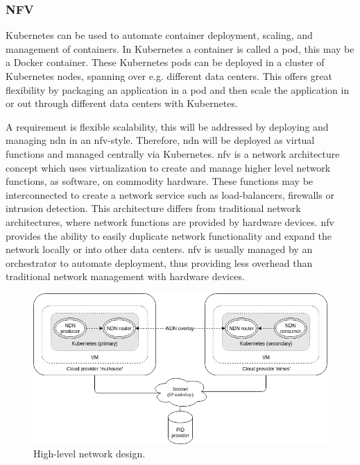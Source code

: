 \documentclass[conference]{IEEEtran}
\begin{document}
\subsubsection{NFV}
Kubernetes can be used to automate container deployment, scaling, and management of containers. In Kubernetes a container is called a pod, this may be a Docker container. These Kubernetes pods can be deployed in a cluster of Kubernetes nodes, spanning over e.g. different data centers. This offers great flexibility by packaging an application in a pod and then scale the application in or out through different data centers with Kubernetes.

A requirement is flexible scalability, this will be addressed by deploying and managing \gls{ndn} in an \gls{nfv}-style. Therefore, \gls{ndn} will be deployed as virtual functions and managed centrally via Kubernetes. \gls{nfv} is a network architecture concept which uses virtualization to create and manage higher level network functions, as software, on commodity hardware. These functions may be interconnected to create a network service such as load-balancers, firewalls or intrusion detection. This architecture differs from traditional network architectures, where network functions are provided by hardware devices. \gls{nfv} provides the ability to easily duplicate network functionality and expand the network locally or into other data centers. \gls{nfv} is usually managed by an orchestrator to automate deployment, thus providing less overhead than traditional network management with hardware devices.

\begin{figure}[H]
\centering
\includegraphics[width=\columnwidth]{images/high-level-network-design.png}
\caption{High-level network design.}
\label{fig:high-level-network-design}
\end{figure}
\end{document}
